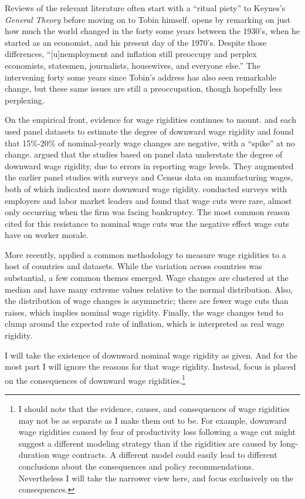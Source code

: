 \documentclass[12pt,a4paper]{scrartcl}            %
\begin{document}
Reviews of the relevant literature often start with a ``ritual piety'' \citep{tobin_1972} to Keynes's \emph{General Theory} before moving on to Tobin himself.
\cite{tobin_1972} opens by remarking on just how much the world changed in the forty some years between the 1930's, when he started as an economist, and his present day of the 1970's.
Despite those differences, ``[u]nemployment and inflation still preoccupy and perplex economists, statesmen, journalists, housewives, and everyone else.''
The intervening forty some years since Tobin's address has also seen remarkable change, but these same issues are still a preoccupation, though hopefully less perplexing.

On the empirical front, evidence for wage rigidities continues to mount.
\cite{mclaughlin_1994} and \cite{card_hyslop_1997} each used panel datasets to estimate the degree of downward wage rigidity and found that 15\%-20\% of nominal-yearly wage changes are negative, with a ``spike'' at no change.
\cite{akerlof_dickens_perry_1996} argued that the studies based on panel data understate the degree of downward wage rigidity, due to errors in reporting wage levels.
They augmented the earlier panel studies with surveys and Census data on manufacturing wages, both of which indicated more downward wage rigidity.
\cite{bewley_1999} conducted surveys with employers and labor market leaders and found that wage cuts were rare, almost only occurring when the firm was facing bankruptcy.
The most common reason cited for this resistance to nominal wage cuts was the negative effect wage cuts have on worker morale.

More recently, \cite{dickens_et_al_2006} applied a common methodology to measure wage rigidities to a host of countries and datasets.
While the variation across countries was substantial, a few common themes emerged.
Wage changes are clustered at the median and have many extreme values relative to the normal distribution.
Also, the distribution of wage changes is asymmetric; there are fewer wage cuts than raises, which implies nominal wage rigidity.
Finally, the wage changes tend to clump around the expected rate of inflation, which is interpreted as real wage rigidity.

I will take the existence of downward nominal wage rigidity as given.
And for the most part I will ignore the reasons for that wage rigidity.
Instead, focus is placed on the consequences of downward wage rigidities.\footnote{
    I should note that the evidence, causes, and consequences of wage rigidities may not be as separate as I make them out to be.
    For example, downward wage rigidities caused by fear of productivity loss following a wage cut might suggest a different modeling strategy than if the rigidities are caused by long-duration wage contracts.
    A different model could easily lead to different conclusions about the consequences and policy recommendations.
    Nevertheless I will take the narrower view here, and focus exclusively on the consequences.
}
\end{document}
